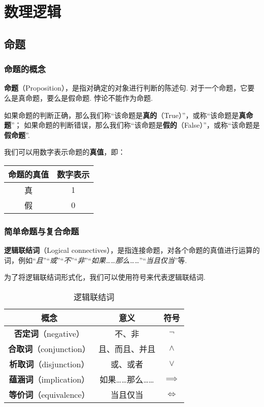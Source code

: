 \chapter{数理逻辑}
\section{命题}
\subsection{命题的概念}
\begin{definition}
\textbf{命题}（Proposition），是指对确定的对象进行判断的陈述句.
对于一个命题，它要么是真命题，要么是假命题.
悖论不能作为命题.

如果命题的判断正确，那么我们称“该命题是\textbf{真的}（True）”，或称“该命题是\textbf{真命题}”；
如果命题的判断错误，那么我们称“该命题是\textbf{假的}（False）”，或称“该命题是\textbf{假命题}”.

我们可以用数字表示命题的\textbf{真值}，即：
\begin{center}
\begin{tabular}{|c|c|}
\hline
\textbf{命题的真值} & \textbf{数字表示} \\ \hline
真 & 1 \\ \hline
假 & 0 \\ \hline
\end{tabular}
\end{center}
\end{definition}

\subsection{简单命题与复合命题}
\begin{definition}
\textbf{逻辑联结词}（Logical connectives），是指连接命题，对各个命题的真值进行运算的词，例如“\emph{且}”“\emph{或}”“\emph{不}”“\emph{非}”“\emph{如果……那么……}”“\emph{当且仅当}”等.

为了将逻辑联结词形式化，我们可以使用符号来代表逻辑联结词.

\begin{table}[bp]
\centering
\begin{tabular}{|*{3}{c|}}
\hline
\textbf{概念} & \textbf{意义} & \textbf{符号} \\ \hline
\textbf{否定词}（negative） & 不、非 & \(\neg\) \\ \hline
\textbf{合取词}（conjunction） & 且、而且、并且 & \(\land\) \\ \hline
\textbf{析取词}（disjunction） & 或、或者 & \(\lor\) \\ \hline
\textbf{蕴涵词}（implication） & 如果……那么…… & \(\implies\) \\ \hline
\textbf{等价词}（equivalence） & 当且仅当 & \(\iff\) \\ \hline
\end{tabular}
\caption{逻辑联结词}
\end{table}
\end{definition}

